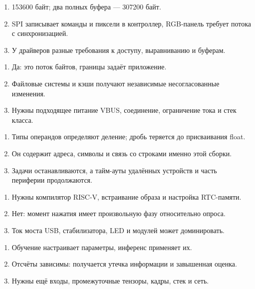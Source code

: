 \begin{enumerate}
\item 153600 байт; два полных буфера --- 307200 байт.
\item SPI записывает команды и пиксели в контроллер, RGB-панель требует потока с синхронизацией.
\item У драйверов разные требования к доступу, выравниванию и буферам.
\end{enumerate}

\begin{enumerate}
\item Да: это поток байтов, границы задаёт приложение.
\item Файловые системы и кэши получают независимые несогласованные изменения.
\item Нужны подходящее питание VBUS, соединение, ограничение тока и стек класса.
\end{enumerate}

\begin{enumerate}
\item Типы операндов определяют деление; дробь теряется до присваивания float.
\item Он содержит адреса, символы и связь со строками именно этой сборки.
\item Задачи останавливаются, а тайм-ауты удалённых устройств и часть периферии продолжаются.
\end{enumerate}

\begin{enumerate}
\item Нужны компилятор RISC-V, встраивание образа и настройка RTC-памяти.
\item Нет: момент нажатия имеет произвольную фазу относительно опроса.
\item Ток моста USB, стабилизатора, LED и модулей может доминировать.
\end{enumerate}

\begin{enumerate}
\item Обучение настраивает параметры, инференс применяет их.
\item Отсчёты зависимы: получается утечка информации и завышенная оценка.
\item Нужны ещё входы, промежуточные тензоры, кадры, стек и сеть.
\end{enumerate}


